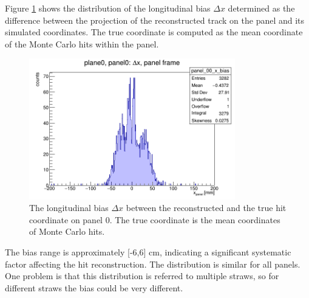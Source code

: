 Figure \ref{fig:bias} shows the distribution of the longitudinal bias $\Delta x$
determined as the difference between the projection 
of the reconstructed track on the panel and its simulated coordinates. 
The true coordinate is computed as the mean coordinate of the Monte Carlo hits within the panel.
\begin{figure}[!h]
    \centering
    \includegraphics[width=0.8\textwidth]{figures/png/panel_00_x_bias.png}
    \caption[The bias between the reconstructed and the true hit coordinate.]{The longitudinal bias 
    $\Delta x$ between the reconstructed and the true hit coordinate on panel 0. 
    The true coordinate is the mean coordinates of Monte Carlo hits.}
    \label{fig:bias}
\end{figure}
The bias range is approximately [-6,6] cm, indicating a significant systematic factor 
affecting the hit reconstruction. The distribution is similar for all panels. 
One problem is that this distribution is referred to multiple straws,
so for different straws the bias could be very different.

